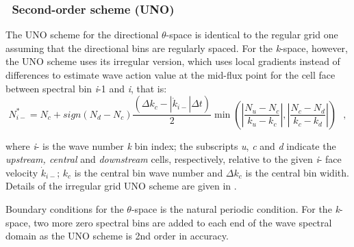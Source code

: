 \vssub
\subsubsection{~Second-order scheme (UNO)}

\noindent
The UNO scheme for the directional $\theta$-space is identical to the regular
grid one assuming that the directional bins are regularly spaced. For the
\emph{k}-space, however, the UNO scheme uses its irregular version, which
uses local gradients instead of differences to estimate wave action value at
the mid-flux point for the cell face between spectral bin \emph{i}-1 and
\emph{i}, that is:
\begin{equation}
  N_{i-}^{*}=N_{c}+sign\left(N_{d}-N_{c}\right)\frac{\left(\Delta
      k_{c}-|\dot{k}_{i-}|\Delta
      t\right)}{2}\min\left(|\frac{N_{u}-N_{c}}{k_{u}-k_{c}}|,|\frac{N_{c}-N_{d}}{k_{c}-k_{d}}|\right)
  \:\:\:,
\label{eq:UNO2irregular}
\end{equation}

\noindent
where \emph{i}- is the wave number \emph{k} bin index; the subscripts
\emph{u}, \emph{c} and \emph{d} indicate the \emph{upstream, central} and
\emph{downstream} cells, respectively, relative to the given \emph{i}- face
velocity $\dot{k}_{i-}$; $k_{c}$ is the central bin wave number and $\Delta
k_{c}$ is the central bin widith. Details of the irregular grid UNO scheme are
given in \cite{art:Li08}.

Boundary conditions for the $\theta$-space is the natural periodic
condition. For the \emph{k}-space, two more zero spectral bins are added to
each end of the wave spectral domain as the UNO scheme is 2nd order in
accuracy.


